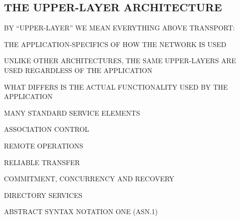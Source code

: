 \begin{bwslide}
\part*	{THE UPPER-LAYER ARCHITECTURE}\bf

\begin{nrtc}
\item	BY ``UPPER-LAYER'' WE MEAN EVERYTHING ABOVE TRANSPORT:
    \begin{nrtc}
    \item	THE APPLICATION-SPECIFICS OF HOW THE NETWORK IS USED
    \end{nrtc}

\item	UNLIKE OTHER ARCHITECTURES, THE SAME UPPER-LAYERS ARE USED
	REGARDLESS OF THE APPLICATION

\item	WHAT DIFFERS IS THE ACTUAL FUNCTIONALITY USED BY THE APPLICATION
\end{nrtc}
\end{bwslide}




\begin{bwslide}

\begin{nrtc}
\item	MANY STANDARD SERVICE ELEMENTS
    \begin{nrtc}
    \item	ASSOCIATION CONTROL

    \item	REMOTE OPERATIONS

    \item	RELIABLE TRANSFER

    \item	COMMITMENT, CONCURRENCY AND RECOVERY

    \item	DIRECTORY SERVICES
    \end{nrtc}

\item	ABSTRACT SYNTAX NOTATION ONE (ASN.1)
\end{nrtc}
\end{bwslide}




